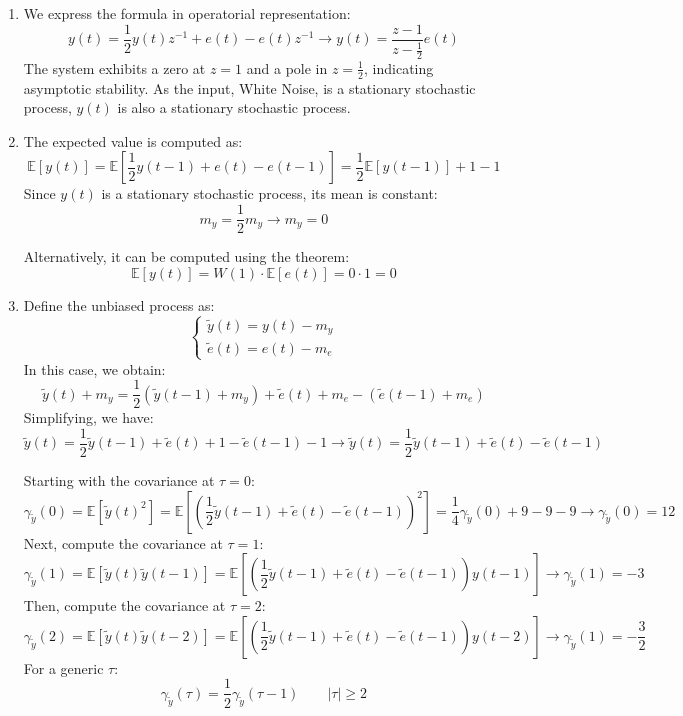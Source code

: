\begin{enumerate}
    \item We express the formula in operatorial representation:
        \[y(t)=\dfrac{1}{2}y(t)z^{-1}+e(t)-e(t)z^{-1}\rightarrow y(t)=\dfrac{z-1}{z-\frac{1}{2}}e(t)\]
        The system exhibits a zero at $z=1$ and a pole in $z=\frac{1}{2}$, indicating asymptotic stability.
        As the input,  White Noise, is a stationary stochastic process, $y(t)$ is also a stationary stochastic process.
    \item The expected value is computed as:
        \[\mathbb{E}\left[ y(t) \right]=\mathbb{E}\left[ \dfrac{1}{2}y(t-1)+e(t)-e(t-1) \right]=\dfrac{1}{2}\mathbb{E}\left[ y(t-1)\right] + 1 - 1\]
        Since $y(t)$ is a stationary stochastic process, its mean is constant:
        \[m_y=\dfrac{1}{2}m_y \rightarrow m_y=0\]

        Alternatively, it can be computed using the theorem: 
        \[\mathbb{E}\left[ y(t) \right]=W(1)\cdot\mathbb{E}\left[ e(t) \right]=0\cdot 1=0\]
    \item Define the unbiased process as: 
        \[\begin{cases}
            \tilde{y}(t)=y(t)-m_y \\
            \tilde{e}(t)=e(t)-m_e
        \end{cases}\]
        In this case, we obtain: 
        \[\tilde{y}(t)+m_y=\dfrac{1}{2}\left(\tilde{y}(t-1)+m_y\right)+\tilde{e}(t)+m_e-\left(\tilde{e}(t-1)+m_e\right)\]
        Simplifying, we have: 
        \[\tilde{y}(t)=\dfrac{1}{2}\tilde{y}(t-1)+\tilde{e}(t)+1-\tilde{e}(t-1)-1\rightarrow\tilde{y}(t)=\dfrac{1}{2}\tilde{y}(t-1)+\tilde{e}(t)-\tilde{e}(t-1)\]

        Starting with the covariance at $\tau=0$: 
        \[\gamma_{\tilde{y}}(0)=\mathbb{E}\left[\tilde{y}{(t)}^2\right]=\mathbb{E}\left[ {\left(\dfrac{1}{2}\tilde{y}(t-1)+\tilde{e}(t)-\tilde{e}(t-1)\right)}^2\right]=\dfrac{1}{4}\gamma_{\tilde{y}}(0) +9-9 - 9\rightarrow \gamma_{\tilde{y}}(0)=12\]
        Next, compute the covariance at $\tau=1$: 
        \[\gamma_{\tilde{y}}(1)=\mathbb{E}\left[ \tilde{y}(t)\tilde{y}(t-1)\right]=\mathbb{E}\left[ \left(\dfrac{1}{2}\tilde{y}(t-1)+\tilde{e}(t)-\tilde{e}(t-1)\right)y(t-1)\right]\rightarrow \gamma_{\tilde{y}}(1)=-3\]
        Then, compute the covariance at $\tau=2$: 
        \[\gamma_{\tilde{y}}(2)=\mathbb{E}\left[ \tilde{y}(t)\tilde{y}(t-2)\right]=\mathbb{E}\left[ \left(\dfrac{1}{2}\tilde{y}(t-1)+\tilde{e}(t)-\tilde{e}(t-1)\right)y(t-2)\right]\rightarrow \gamma_{\tilde{y}}(1)=-\dfrac{3}{2}\]
        For a generic $\tau$: 
        \[\gamma_{\tilde{y}}(\tau)=\dfrac{1}{2}\gamma_{\tilde{y}}(\tau-1) \qquad \left\lvert \tau \right\rvert \geq 2\]
\end{enumerate}